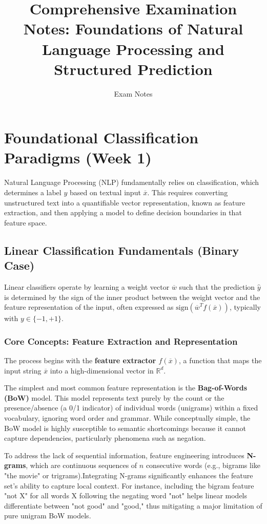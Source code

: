 \documentclass{article}
\title{Comprehensive Examination Notes: Foundations of Natural Language Processing and Structured Prediction}
\author{Exam Notes}
\date{}
\begin{document}
\maketitle

\tableofcontents

\clearpage

\section{Foundational Classification Paradigms (Week 1)}

Natural Language Processing (NLP) fundamentally relies on classification, which determines a label $y$ based on textual input $\overline{x}$. This requires converting unstructured text into a quantifiable vector representation, known as feature extraction, and then applying a model to define decision boundaries in that feature space.

\subsection{Linear Classification Fundamentals (Binary Case)}

Linear classifiers operate by learning a weight vector $\overline{w}$ such that the prediction $\hat{y}$ is determined by the sign of the inner product between the weight vector and the feature representation of the input, often expressed as $\text{sign}(\overline{w}^{T}f(\overline{x}))$, typically with $y \in \{-1, +1\}$.

\subsubsection{Core Concepts: Feature Extraction and Representation}

The process begins with the \textbf{feature extractor $f(\overline{x})$}, a function that maps the input string $\overline{x}$ into a high-dimensional vector in $\mathbb{R}^d$.

The simplest and most common feature representation is the \textbf{Bag-of-Words (BoW)} model. This model represents text purely by the count or the presence/absence (a 0/1 indicator) of individual words (unigrams) within a fixed vocabulary, ignoring word order and grammar. While conceptually simple, the BoW model is highly susceptible to semantic shortcomings because it cannot capture dependencies, particularly phenomena such as negation.

To address the lack of sequential information, feature engineering introduces \textbf{N-grams}, which are continuous sequences of $n$ consecutive words (e.g., bigrams like "the movie" or trigrams).Integrating N-grams significantly enhances the feature set's ability to capture local context. For instance, including the bigram feature "not X" for all words X following the negating word "not" helps linear models differentiate between "not good" and "good," thus mitigating a major limitation of pure unigram BoW models.
\end{document}
